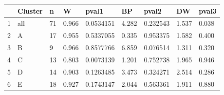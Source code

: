 \begin{table}[ht]
\centering
\begin{tabular}{rllllllll}
  \hline
 & Cluster & n & W & pval1 & BP & pval2 & DW & pval3 \\ 
  \hline
1 & all & 71 & 0.966 & 0.0534151 & 4.282 & 0.232543 & 1.537 & 0.038 \\ 
  2 & A & 17 & 0.955 & 0.5337055 & 0.335 & 0.953375 & 1.582 & 0.400 \\ 
  3 & B & 9 & 0.966 & 0.8577766 & 6.859 & 0.076514 & 1.311 & 0.320 \\ 
  4 & C & 13 & 0.803 & 0.0073139 & 1.201 & 0.752738 & 1.965 & 0.946 \\ 
  5 & D & 14 & 0.903 & 0.1263485 & 3.473 & 0.324271 & 2.514 & 0.286 \\ 
  6 & E & 18 & 0.927 & 0.1743147 & 2.044 & 0.563361 & 1.911 & 0.880 \\ 
   \hline
\end{tabular}
\end{table}
